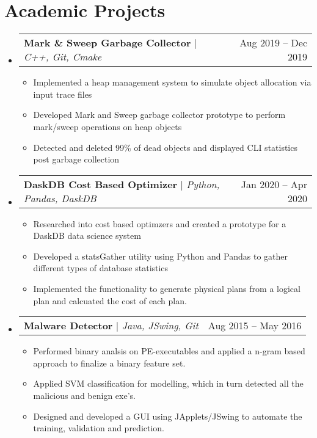\documentclass[letterpaper,10pt]{article}
\makeatletter
\newcommand{\resumeItem}[1]{
  \item\small{
    {#1 \vspace{-2pt}}
  }
}
\newcommand{\resumeProjectHeading}[2]{
    \item
    \begin{tabular*}{0.97\textwidth}{l@{\extracolsep{\fill}}r}
      \small#1 & #2 \\
    \end{tabular*}\vspace{-7pt}
}
\newcommand{\resumeSubHeadingListStart}{\begin{itemize}[leftmargin=0.15in, label={}]}
\newcommand{\resumeSubHeadingListEnd}{\end{itemize}}
\newcommand{\resumeItemListStart}{\begin{itemize}}
\newcommand{\resumeItemListEnd}{\end{itemize}\vspace{-5pt}}
\makeatother
\begin{document}
\section{Academic Projects}
    \resumeSubHeadingListStart
    \resumeProjectHeading
          {\textbf{Mark \& Sweep Garbage Collector} $|$ \emph{C++, Git, Cmake}}{Aug 2019 -- Dec 2019}
          \resumeItemListStart
            \resumeItem{Implemented a heap management system to simulate object allocation via input trace files}
            \resumeItem{Developed Mark and Sweep garbage collector prototype to perform mark/sweep operations on heap objects}
            \resumeItem{Detected and deleted 99\% of dead objects and displayed CLI statistics post garbage collection}
          \resumeItemListEnd  
    \resumeProjectHeading
          {\textbf{DaskDB Cost Based Optimizer} $|$ \emph{Python, Pandas, DaskDB}}{Jan 2020 -- Apr 2020}
          \resumeItemListStart
            \resumeItem{Researched into cost based optimzers and created a prototype for a DaskDB data science system}
            \resumeItem{Developed a statsGather utility using Python and Pandas to gather different types of database statistics}
            \resumeItem{Implemented the functionality to generate physical plans from a logical plan and calcuated the cost of each plan.}
          \resumeItemListEnd
      \resumeProjectHeading
          {\textbf{Malware Detector} $|$ \emph{Java, JSwing, Git}}{Aug 2015 -- May 2016}
          \resumeItemListStart
            \resumeItem{Performed binary analsis on PE-executables and applied a n-gram based approach to finalize a binary feature set.}
            \resumeItem{Applied SVM classification for modelling, which in turn detected all the malicious and benign exe's.}
            \resumeItem{Designed and developed a GUI using JApplets/JSwing to automate the training, validation and prediction.}
          \resumeItemListEnd
    \resumeSubHeadingListEnd
\end{document}

